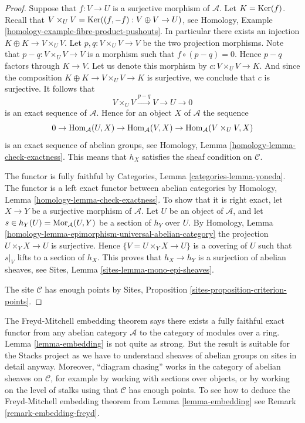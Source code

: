 \begin{proof}
Suppose that $f : V \to U$ is a surjective morphism of $\mathcal{A}$.
Let $K = \mathop{\mathrm{Ker}}(f)$. Recall that
$V \times_U V = \mathop{\mathrm{Ker}}((f, -f) : V \oplus V \to U)$, see
Homology, Example \ref{homology-example-fibre-product-pushouts}.
In particular there exists an injection $K \oplus K \to V \times_U V$.
Let $p, q : V \times_U V \to V$ be the two projection morphisms.
Note that $p - q : V \times_U V \to V$ is a morphism such that
$f \circ (p  - q) = 0$. Hence $p - q$ factors through $K \to V$.
Let us denote this morphism by $c : V \times_U V \to K$.
And since the composition $K \oplus K \to V \times_U V \to K$
is surjective, we conclude that $c$ is surjective. It follows that
$$
V \times_U V \xrightarrow{p - q} V \to U \to 0
$$
is an exact sequence of $\mathcal{A}$.
Hence for an object $X$ of $\mathcal{A}$ the sequence
$$
0 \to
\mathop{\mathrm{Hom}}\nolimits_\mathcal{A}(U, X) \to
\mathop{\mathrm{Hom}}\nolimits_\mathcal{A}(V, X) \to
\mathop{\mathrm{Hom}}\nolimits_\mathcal{A}(V \times_U V, X)
$$
is an exact sequence of abelian groups, see
Homology, Lemma \ref{homology-lemma-check-exactness}.
This means that $h_X$ satisfies the sheaf condition
on $\mathcal{C}$.

\medskip\noindent
The functor is fully faithful by
Categories, Lemma \ref{categories-lemma-yoneda}.
The functor is a left exact functor between abelian categories by
Homology, Lemma \ref{homology-lemma-check-exactness}.
To show that it is right exact, let $X \to Y$ be a surjective morphism
of $\mathcal{A}$. Let $U$ be an object of $\mathcal{A}$, and let
$s \in h_Y(U) = \mathop{\mathrm{Mor}}\nolimits_\mathcal{A}(U, Y)$ be a section of $h_Y$
over $U$. By
Homology, Lemma \ref{homology-lemma-epimorphism-universal-abelian-category}
the projection $U \times_Y X \to U$ is surjective.
Hence $\{V = U \times_Y X \to U\}$ is a covering of $U$ such that
$s|_V$ lifts to a section of $h_X$. This proves that
$h_X \to h_Y$ is a surjection of abelian sheaves, see
Sites, Lemma \ref{sites-lemma-mono-epi-sheaves}.

\medskip\noindent
The site $\mathcal{C}$ has enough points by
Sites, Proposition \ref{sites-proposition-criterion-points}.
\end{proof}

\begin{remark}
\label{remark-embedding}
The Freyd-Mitchell embedding theorem says there exists a fully faithful
exact functor from any abelian category $\mathcal{A}$
to the category of modules over a ring.
Lemma \ref{lemma-embedding}
is not quite as strong. But the result is suitable for the
Stacks project as we have to understand sheaves of abelian groups on
sites in detail anyway. Moreover, ``diagram chasing'' works in the category
of abelian sheaves on $\mathcal{C}$, for example by working with sections over
objects, or by working on the level of stalks using that $\mathcal{C}$ has
enough points. To see how to deduce the Freyd-Mitchell embedding theorem from
Lemma \ref{lemma-embedding}
see
Remark \ref{remark-embedding-freyd}.
\end{remark}

